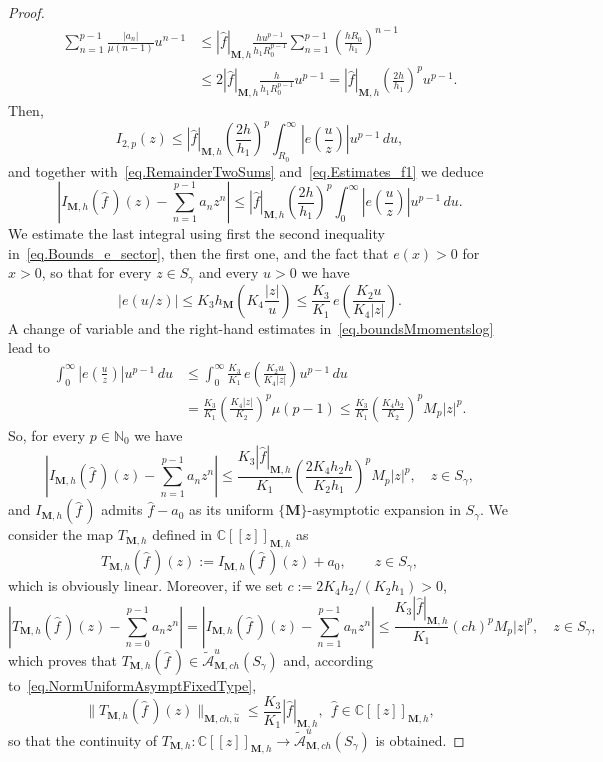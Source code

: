 \documentclass[11pt,a4paper]{article}
\theoremstyle{plain}
\theoremstyle{definition}
\numberwithin{equation}{section}
\newcommand{\N}{\mathbb{N}}
\newcommand{\C}{\mathbb{C}}
\newcommand{\M}{{\boldsymbol{M}}}
\def\ga{\gamma}
\begin{document}
\begin{proof}
	\begin{align*}
		\sum_{n=1}^{p-1}\frac{|a_n|}{\mu(n-1)}u^{n-1}&\le |\widehat{f}|_{\M,h}\frac{hu^{p-1}}{h_1R_0^{p-1}} \sum_{n=1}^{p-1}\left(\frac{hR_0}{h_1}\right)^{n-1}\\
		&\le 2|\widehat{f}|_{\M,h}\frac{h}{h_1R_0^{p-1}}u^{p-1}
=|\widehat{f}|_{\M,h}\left(\frac{2h}{h_1}\right)^pu^{p-1}.
	\end{align*}
	Then,
	\begin{equation*}%
		I_{2,p}(z)\le |\widehat{f}|_{\M,h} \left(\frac{2h}{h_1}\right)^p \int_{R_0}^{\infty}\left|e \left(\frac{u}{z}\right) \right|u^{p-1}\,du,
	\end{equation*}
and together with~\eqref{eq.RemainderTwoSums} and~\eqref{eq.Estimates_f1} we deduce
$$
\left|I_{\M,h}(\widehat{f}\,)(z)-\sum_{n=1}^{p-1}a_nz^n\right|\le |\widehat{f}|_{\M,h} \left(\frac{2h}{h_1}\right)^p \int_{0}^{\infty}\left|e \left(\frac{u}{z}\right) \right|u^{p-1}\,du.
$$
We estimate the last integral using first the second inequality in~\eqref{eq.Bounds_e_sector}, then the first one, and the fact that $e(x)>0$ for $x>0$, so that for every $z\in S_{\ga}$ and every $u>0$ we have
	$$
	|e(u/z)|\le K_3h_{\M}\left(K_4\frac{|z|}{u}\right)\le
	\frac{K_3}{K_1}\,e\left(\frac{K_2u}{K_4|z|}\right).
	$$
A change of variable and the right-hand estimates in~\eqref{eq.boundsMmomentslog} lead to
	\begin{align*}
		\int_{0}^{\infty}\left|e \left(\frac{u}{z}\right) \right|u^{p-1}\,du
		&\le \int_{0}^{\infty}\frac{K_3}{K_1}\,e\left(\frac{K_2u}{K_4|z|}\right) u^{p-1}\,du\\
		&=\frac{K_3}{K_1}\left(\frac{K_4|z|}{K_2}\right)^{p}\mu(p-1)
		\le \frac{K_3}{K_1}\left(\frac{K_4h_2}{K_2}\right)^{p}M_{p}|z|^{p}.
	\end{align*}
So, for every $p\in\N_0$ we have
	$$
	\left|I_{\M,h}(\widehat{f}\,)(z)-\sum_{n=1}^{p-1}a_nz^n\right|\le \frac{K_3|\widehat{f}|_{\M,h}}{K_1} \left(\frac{2K_4h_2h}{K_2h_1}\right)^pM_p|z|^p,\quad z\in S_{\ga},
	$$
and $I_{\M,h}(\widehat{f}\,)$ admits $\widehat{f}-a_0$ as its uniform $\{\M\}$-asymptotic expansion in $S_{\ga}$. We consider the map $T_{\M,h}$ defined in $\C[[z]]_{\M,h}$ as
	\begin{equation*}
T_{\M,h}(\widehat{f}\,)(z):=I_{\M,h}(\widehat{f}\,)(z)+a_0,\qquad z\in S_{\ga},
	\end{equation*}
which is obviously linear. Moreover, if we set $c:=2K_4h_2/(K_2h_1)>0$,
	\begin{equation*}
\left|T_{\M,h}(\widehat{f}\,)(z)-\sum_{n=0}^{p-1}a_nz^n\right|= \left|I_{\M,h}(\widehat{f}\,)(z)-\sum_{n=1}^{p-1}a_nz^n\right|\le \frac{K_3|\widehat{f}|_{\M,h}}{K_1} \left(ch\right)^pM_p|z|^p,\quad z\in S_{\ga},
	\end{equation*}
	which proves that $T_{\M,h}(\widehat{f}\,)\in\widetilde{\mathcal{A}}^u_{\M,ch}(S_{\ga})$ and, according to~\eqref{eq.NormUniformAsymptFixedType},
	$$
	\|T_{\M,h}(\widehat{f}\,)(z)\|_{\M,ch,\overset{\sim}{u}}\le \frac{K_3}{K_1}|\widehat{f}|_{\M,h},\ \ \widehat{f}\in\C[[z]]_{\M,h},
	$$
so that the continuity of $T_{\M,h}\colon \C[[z]]_{\M,h}\to \widetilde{\mathcal{A}}^u_{\M,ch}(S_{\ga})$ is obtained.
	

\end{proof}
\end{document}
